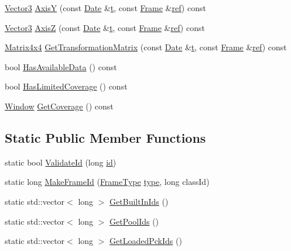 \begin{DoxyCompactItemize}
\item 
\hyperlink{class_vector3}{Vector3} \hyperlink{class_frame_a5ed0a2188dc255484b793ae5288c36c0}{Axis\+Y} (const \hyperlink{class_date}{Date} \&\hyperlink{glext_8h_a7d65d00ca3b0630d9b5c52df855b19f5}{t}, const \hyperlink{class_frame}{Frame} \&\hyperlink{glext_8h_ad32bdec748ba376f6c0d2df39ab9a95b}{ref}) const 
\item 
\hyperlink{class_vector3}{Vector3} \hyperlink{class_frame_a89ebe688b416263f06f2393151194e77}{Axis\+Z} (const \hyperlink{class_date}{Date} \&\hyperlink{glext_8h_a7d65d00ca3b0630d9b5c52df855b19f5}{t}, const \hyperlink{class_frame}{Frame} \&\hyperlink{glext_8h_ad32bdec748ba376f6c0d2df39ab9a95b}{ref}) const 
\item 
\hyperlink{class_matrix4x4}{Matrix4x4} \hyperlink{class_frame_a4862be40cebae8c367031baf2ca6dc8b}{Get\+Transformation\+Matrix} (const \hyperlink{class_date}{Date} \&\hyperlink{glext_8h_a7d65d00ca3b0630d9b5c52df855b19f5}{t}, const \hyperlink{class_frame}{Frame} \&\hyperlink{glext_8h_ad32bdec748ba376f6c0d2df39ab9a95b}{ref}) const 
\item 
bool \hyperlink{class_frame_afbf0802e2374c57dd80f754bd0c232da}{Has\+Available\+Data} () const 
\item 
bool \hyperlink{class_frame_af03488c8a8eb25e55725b1af7c379671}{Has\+Limited\+Coverage} () const 
\item 
\hyperlink{class_window}{Window} \hyperlink{class_frame_a54fe03adc618817f27c43738ca77ccf8}{Get\+Coverage} () const 
\end{DoxyCompactItemize}
\subsection*{Static Public Member Functions}
\begin{DoxyCompactItemize}
\item 
static bool \hyperlink{class_frame_a2530927116bf3b764862623c518d274e}{Validate\+Id} (long \hyperlink{glext_8h_a58c2a664503e14ffb8f21012aabff3e9}{id})
\item 
static long \hyperlink{class_frame_a33201e744d6593f2294bfb57bcb448d9}{Make\+Frame\+Id} (\hyperlink{class_frame_ad2f22450377db20233914c9ec0a21df4}{Frame\+Type} \hyperlink{glext_8h_ab7c1afc09f67635c2c376638fcc0db5f}{type}, long class\+Id)
\item 
static std\+::vector$<$ long $>$ \hyperlink{class_frame_af143d92b7e9c07d2db5aec79b89ac1b2}{Get\+Built\+In\+Ids} ()
\item 
static std\+::vector$<$ long $>$ \hyperlink{class_frame_a80d4a5985129beb4d8010f072def67d7}{Get\+Pool\+Ids} ()
\item 
static std\+::vector$<$ long $>$ \hyperlink{class_frame_ac5865bd9a4b0f8904b059fc005311971}{Get\+Loaded\+Pck\+Ids} ()
\end{DoxyCompactItemize}
